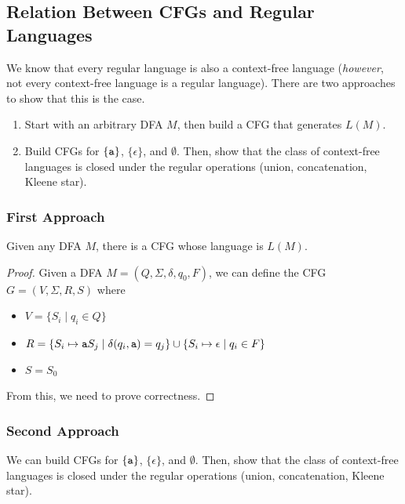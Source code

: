 \documentclass[letterpaper]{article}
\begin{document}
\subsection{Relation Between CFGs and Regular Languages}
We know that every regular language is also a context-free language (\emph{however}, not every context-free language is a regular language). There are two approaches to show that this is the case.
\begin{enumerate}
    \item Start with an arbitrary DFA $M$, then build a CFG that generates $L(M)$. 
    \item Build CFGs for $\{\texttt{a}\}$, $\{\epsilon\}$, and $\emptyset$. Then, show that the class of context-free languages is closed under the regular operations (union, concatenation, Kleene star). 
\end{enumerate}

\subsubsection{First Approach}
\begin{proposition}
    Given any DFA $M$, there is a CFG whose language is $L(M)$. 
\end{proposition}

\begin{mdframed}[nobreak=true]
    \begin{proof}
        Given a DFA $M = (Q, \Sigma, \delta, q_0, F)$, we can define the CFG $G = (V, \Sigma, R, S)$ where 
        \begin{itemize}
            \item $V = \{S_i \mid q_i \in Q\}$
            \item $R = \{S_i \mapsto \texttt{a}S_j \mid \delta(q_i, \texttt{a}) = q_j\} \cup \{S_i \mapsto \epsilon \mid q_i \in F\}$
            \item $S = S_0$
        \end{itemize}
        From this, we need to prove correctness.
    \end{proof}
\end{mdframed}

\subsubsection{Second Approach}
We can build CFGs for $\{\texttt{a}\}$, $\{\epsilon\}$, and $\emptyset$. Then, show that the class of context-free languages is closed under the regular operations (union, concatenation, Kleene star). 
\end{document}
